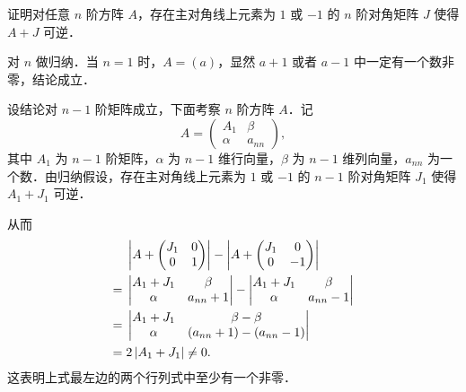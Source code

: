 证明对任意 $n$ 阶方阵 $A$，存在主对角线上元素为 $1$ 或 $-1$ 的 $n$ 阶对角矩阵 $J$ 使得 $A+J$ 可逆．
\begin{solution}
对 $n$ 做归纳．当 $n=1$ 时，$A=(a)$，显然 $a+1$ 或者 $a-1$ 中一定有一个数非零，结论成立．

设结论对 $n-1$ 阶矩阵成立，下面考察 $n$ 阶方阵 $A$．记
\[
A=\begin{pmatrix}A_{1} & \beta\\ \alpha & a_{nn}\end{pmatrix},
\]
其中 $A_{1}$ 为 $n-1$ 阶矩阵，$\alpha$ 为 $n-1$ 维行向量，$\beta$ 为 $n-1$ 维列向量，$a_{nn}$ 为一个数．由归纳假设，存在主对角线上元素为 $1$ 或 $-1$ 的 $n-1$ 阶对角矩阵 $J_{1}$ 使得 $A_{1}+J_{1}$ 可逆．

从而
\begin{align*}
&\begin{vmatrix}A+\begin{pmatrix}J_{1} & 0\\ 0 & 1\end{pmatrix}\end{vmatrix}
-\begin{vmatrix}A+\begin{pmatrix}J_{1} & 0\\ 0 & -1\end{pmatrix}\end{vmatrix}\\
={}&\begin{vmatrix}A_{1}+J_{1} & \beta\\ \alpha & a_{nn}+1\end{vmatrix}
-\begin{vmatrix}A_{1}+J_{1} & \beta\\ \alpha & a_{nn}-1\end{vmatrix}\\
={}&\begin{vmatrix}A_{1}+J_{1} & \beta-\beta\\ \alpha & (a_{nn}+1)-(a_{nn}-1)\end{vmatrix}\\
={}&2\left|A_{1}+J_{1}\right|\ne 0.
\end{align*}
这表明上式最左边的两个行列式中至少有一个非零．


\end{solution}
